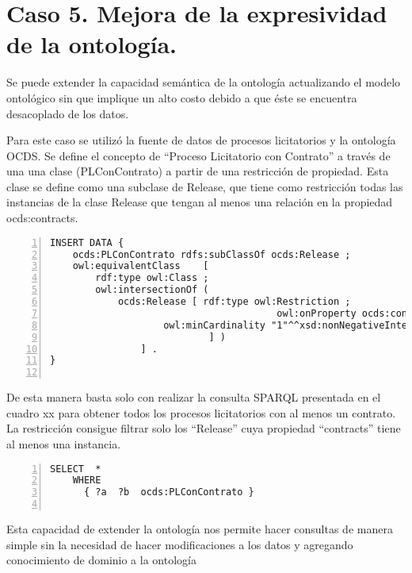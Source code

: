 \section{Caso 5. Mejora de la expresividad de la ontología. }

Se puede extender la capacidad semántica de la ontología actualizando el modelo ontológico sin que implique un alto costo debido a que éste se encuentra desacoplado de los datos.

Para este caso se utilizó la fuente de datos de procesos licitatorios y la ontología OCDS. Se define el concepto de “Proceso Licitatorio con Contrato” a través de una una clase (PLConContrato) a partir de una restricción de propiedad. Esta clase se define como una subclase de Release, que tiene como restricción todas las instancias de la clase Release que tengan al menos una relación en la propiedad ocds:contracts.


\begin{lstlisting}[captionpos=b, caption=Información referente al proceso licitatorio cuyo identificacor es, label=lst:caso5-1,  numbers=left,  numberstyle=\tiny\color{mygray},
    basicstyle=\small,frame=single]
INSERT DATA {
    ocds:PLConContrato rdfs:subClassOf ocds:Release ; 
    owl:equivalentClass    [ 
        rdf:type owl:Class ;
        owl:intersectionOf (   
            ocds:Release [ rdf:type owl:Restriction ;
                                        owl:onProperty ocds:contracts; 
                    owl:minCardinality "1"^^xsd:nonNegativeInteger ;
                            ] )
                ] .
}
    
 \end{lstlisting}

 De esta manera basta solo con realizar la consulta SPARQL presentada en el cuadro xx para obtener todos los procesos licitatorios con al menos un contrato. La restricción consigue filtrar solo los “Release” cuya propiedad “contracts” tiene al menos una instancia.

 \begin{lstlisting}[captionpos=b, caption=Información referente al proceso licitatorio cuyo identificacor es, label=lst:caso5-2,  numbers=left,  numberstyle=\tiny\color{mygray},
    basicstyle=\small,frame=single]
SELECT  *
    WHERE
      { ?a  ?b  ocds:PLConContrato }
    
 \end{lstlisting}

 Esta capacidad de extender la ontología nos permite hacer consultas de manera simple sin la necesidad de hacer modificaciones a los datos y agregando conocimiento de dominio a la ontología